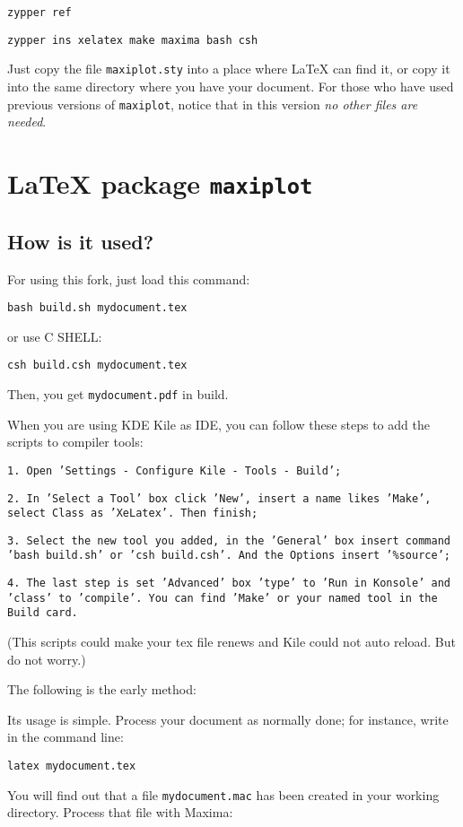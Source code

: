 \documentclass[11pt,a4paper]{article}
\begin{document}
\texttt{zypper ref}

\texttt{zypper ins xelatex make maxima bash csh}

Just copy the file \texttt{maxiplot.sty} into a place where \LaTeX{}
can find it, or copy it into the same directory where you have your
document. For those who have used previous versions of
\texttt{maxiplot}, notice that in this version \emph{no other files are
  needed}.

\section{ \LaTeX{} package \texttt{maxiplot}}

\subsection{How is it used?}
For using this fork, just load this command:

\texttt{bash build.sh mydocument.tex}

or use C SHELL:

\texttt{csh build.csh mydocument.tex}

Then, you get \texttt{mydocument.pdf} in build. 

When you are using KDE Kile as IDE, you can follow these steps to add the scripts to compiler tools:

\texttt{1. Open 'Settings - Configure Kile - Tools - Build';}

\texttt{2. In 'Select a Tool' box click 'New', insert a name likes 'Make', select Class as 'XeLatex'. Then finish;}

\texttt{3. Select the new tool you added, in the 'General' box insert command 'bash build.sh' or 'csh build.csh'. And the Options insert '\%source';}

\texttt{4. The last step is set 'Advanced' box 'type' to 'Run in Konsole' and 'class' to 'compile'. You can find 'Make' or your named tool in the Build card.}

(This scripts could make your tex file renews and Kile could not auto reload. But do not worry.)

The following is the early method:

Its usage is simple. Process your document as normally done; for
instance, write in the command line:

\texttt{latex mydocument.tex}

You will find out that a file \texttt{mydocument.mac} has been
created in your working directory. Process that file with Maxima:
\end{document}
